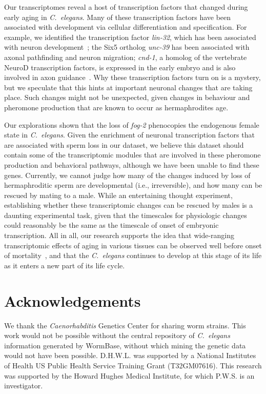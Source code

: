 \documentclass[10pt,letterpaper,twocolumn]{article}
\newcommand{\cel}{\emph{C.~elegans}}
\newcommand{\fog}{\emph{fog-2}}
\begin{document}
Our transcriptomes reveal a host of transcription factors that changed during early aging in \cel{}. Many of these transcription factors have been associated with development via cellular differentiation and specification. For example, we identified the transcription factor \emph{lin-32}, which has been associated with neuron development~\cite{Chalfie1989,Zhao1995,Portman2000}; the Six5 ortholog \emph{unc-39} has been associated with axonal pathfinding and neuron migration\cite{Yanowitz2004}; \emph{cnd-1}, a homolog  of the vertebrate NeuroD transcription factors, is expressed in the early embryo and is also involved in axon guidance~\cite{Schmitz2007}. Why these transcription factors turn on is a mystery, but we speculate that this hints at important neuronal changes that are taking place. Such changes might not be unexpected, given changes in behaviour and pheromone production that are known to occur as hermaphrodites age.

Our explorations shown that the loss of \fog{} phenocopies the endogenous female state in \cel{}.
Given the enrichment of neuronal transcription factors that are associated with sperm loss in our dataset, we believe this dataset should contain some of the transcriptomic modules that are involved in these pheromone production and behavioral pathways, although we have been unable to find these genes. Currently, we cannot judge how many of the changes induced by loss of hermaphroditic sperm are developmental (i.e., irreversible), and how many can be rescued by mating to a male.
While an entertaining thought experiment, establishing whether these transcriptomic changes can be rescued by males is a daunting experimental task, given that the timescales for physiologic changes could reasonably be the same as the timescale of onset of embryonic transcription. All in all, our research supports the idea that wide-ranging transcriptomic effects of aging in various tissues can be observed well before onset of mortality~\cite{Stroustrup2013}, and that the \cel{} continues to develop at this stage of its life as it enters a new part of its life cycle.

\section*{Acknowledgements}

We thank the \emph{Caenorhabditis} Genetics Center for sharing worm strains. This work would not be possible without the central repository of \cel{} information generated by WormBase, without which mining the genetic data would not have been possible. D.H.W.L. was supported by a National Institutes of Health US Public Health Service Training Grant (T32GM07616). This research was supported by the Howard Hughes Medical Institute, for which P.W.S. is an investigator.
\end{document}
